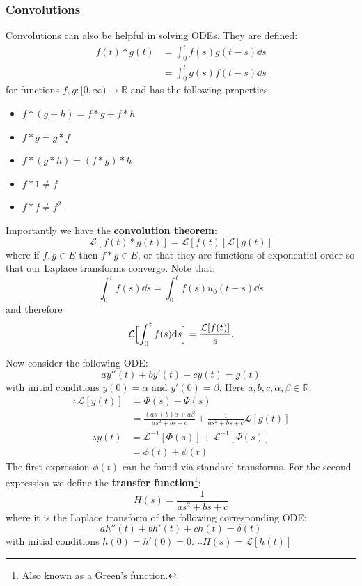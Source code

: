 \documentclass{article}
\begin{document}
\subsubsection{Convolutions}
Convolutions can also be helpful in solving ODEs.
They are defined:
\begin{align*}
    f(t)*g(t)
    &=\int_{0}^{t}f(s)g(t-s)\dd s \\
    &=\int_{0}^{t}g(s)f(t-s)\dd s
\end{align*}
for functions $f,g:[0,\infty)\rightarrow\mathbb{R}$
and has the following properties:
\begin{itemize}
    \item $f*(g+h)=f*g+f*h$
    \item $f*g=g*f$
    \item $f*(g*h)=(f*g)*h$
    \item $f*1\neq f$
    \item $f*f\neq f^2$.
\end{itemize}
Importantly we have the \textbf{convolution theorem}:
$$\mathcal{L}[f(t)*g(t)]=\mathcal{L}[f(t)]\mathcal{L}[g(t)]$$
where if $f,g\in E$ then $f*g\in E$, or that they
are functions of exponential order so that our Laplace
transforms converge. Note that:
$$\int_{0}^{t}f(s)\dd s
=\int_{0}^{t}f(s)u_0(t-s)\dd s$$
and therefore
$$\mathcal{L}\Bigl[
\int_{0}^{t}f(s)\dd s
\Bigr]=\frac{\mathcal{L}[f(t)]}{s}.$$

\newpage

Now consider the following ODE:
$$ay''(t)+by'(t)+cy(t)=g(t)$$
with initial conditions $y(0)=\alpha$
and $y'(0)=\beta$.
Here $a,b,c,\alpha,\beta\in\mathbb{R}$.
\begin{align*}
    \therefore\mathcal{L}[y(t)]
    &=\Phi(s)+\Psi(s) \\
    &=\frac{(as+b)\alpha+a\beta}
    {as^2+bs+c}
    +\frac{1}{as^2+bs+c}\mathcal{L}[g(t)]
\end{align*}
\begin{align*}
    \therefore y(t)
    &=\mathcal{L}^{-1}[\Phi(s)]
    +\mathcal{L}^{-1}[\Psi(s)] \\
    &=\phi(t)+\psi(t)
\end{align*}
The first expression $\phi(t)$ can be found via
standard transforms.
For the second expression we define the
\textbf{transfer function}\footnote{Also known as a Green's function.}:
$$H(s)=\frac{1}{as^2+bs+c}$$
where it is the Laplace transform of the following
corresponding ODE:
$$ah''(t)+bh'(t)+ch(t)=\delta(t)$$
with initial conditions $h(0)=h'(0)=0$.
$\therefore H(s)=\mathcal{L}[h(t)]$
\end{document}
